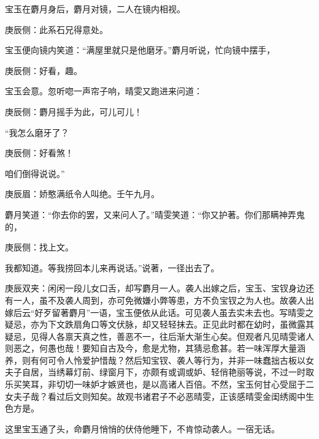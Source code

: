 \begin{parag}
    宝玉在麝月身后，麝月对镜，二人在镜内相视。\begin{note}庚辰侧：此系石兄得意处。\end{note}宝玉便向镜内笑道：“满屋里就只是他磨牙。”麝月听说，忙向镜中摆手，\begin{note}庚辰侧：好看，趣。\end{note}宝玉会意。忽听唿一声帘子响，晴雯又跑进来问道：\begin{note}庚辰侧：麝月摇手为此，可儿可儿！\end{note}“我怎么磨牙了？\begin{note}庚辰侧：好看煞！\end{note}咱们倒得说说。”\begin{note}庚辰眉：娇憨满纸令人叫绝。壬午九月。\end{note}麝月笑道：“你去你的罢，又来问人了。”晴雯笑道：“你又护著。你们那瞒神弄鬼的，\begin{note}庚辰侧：找上文。\end{note}我都知道。等我捞回本儿来再说话。”说著，一径出去了。\begin{note}庚辰双夹：闲闲一段儿女口舌，却写麝月一人。袭人出嫁之后，宝玉、宝钗身边还有一人，虽不及袭人周到，亦可免微嫌小弊等患，方不负宝钗之为人也。故袭人出嫁后云“好歹留著麝月”一语，宝玉便依从此话。可见袭人虽去实未去也。写晴雯之疑忌，亦为下文跌扇角口等文伏脉，却又轻轻抹去。正见此时都在幼时，虽微露其疑忌，见得人各禀天真之性，善恶不一，往后渐大渐生心矣。但观者凡见晴雯诸人则恶之，何愚也哉！要知自古及今，愈是尤物，其猜忌愈甚。若一味浑厚大量涵养，则有何可令人怜爱护惜哉？然后知宝钗、袭人等行为，并非一味蠢拙古板以女夫子自居，当绣幕灯前、绿窗月下，亦颇有或调或妒、轻俏艳丽等说，不过一时取乐买笑耳，非切切一味妒才嫉贤也，是以高诸人百倍。不然，宝玉何甘心受屈于二女夫子哉？看过后文则知矣。故观书诸君子不必恶晴雯，正该感晴雯金闺绣阁中生色方是。\end{note}这里宝玉通了头，命麝月悄悄的伏侍他睡下，不肯惊动袭人。一宿无话。
\end{parag}


